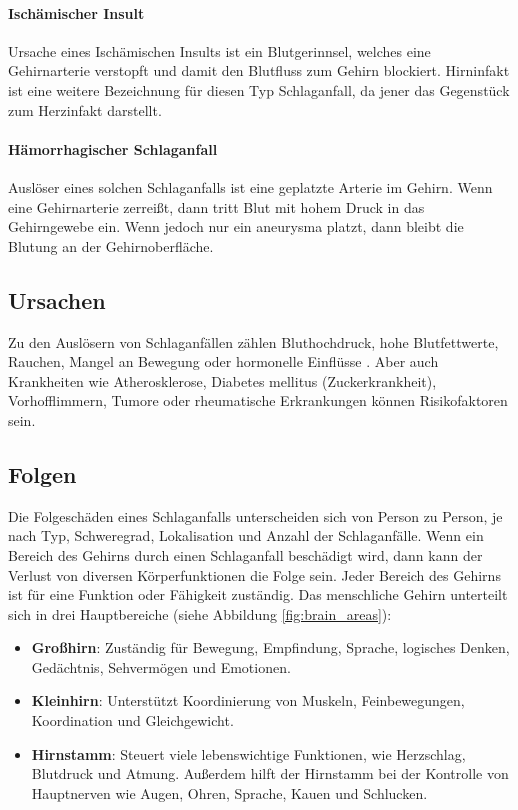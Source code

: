 \paragraph{Ischämischer Insult} \label{paragrah:isch_insult} 
Ursache eines Ischämischen Insults ist ein Blutgerinnsel, welches eine Gehirnarterie verstopft und damit den Blutfluss zum Gehirn blockiert. Hirninfakt ist eine weitere Bezeichnung für diesen Typ Schlaganfall, da jener das Gegenstück zum Herzinfakt darstellt. \cite{haring:2014:insult} 

\paragraph{Hämorrhagischer Schlaganfall}\label{paragrah:isch_haemor} 
Auslöser eines solchen Schlaganfalls ist eine geplatzte Arterie im Gehirn. Wenn eine Gehirnarterie zerreißt, dann tritt Blut mit hohem Druck in das Gehirngewebe ein. Wenn jedoch nur ein \Gls{aneurysma} platzt, dann bleibt die Blutung an der Gehirnoberfläche. \cite{haring:2014:insult} 

\subsection{Ursachen}
Zu den Auslösern von Schlaganfällen zählen Bluthochdruck, hohe Blutfettwerte, Rauchen, Mangel an Bewegung oder hormonelle Einflüsse \cite{haring:2014:insult}\cite{world:2005:avoiding}. Aber auch Krankheiten wie Atherosklerose, Diabetes mellitus (Zuckerkrankheit), Vorhofflimmern, Tumore oder rheumatische Erkrankungen können Risikofaktoren sein. \cite{haring:2014:insult} 

\subsection{Folgen}
Die Folgeschäden eines Schlaganfalls unterscheiden sich von Person zu Person, je nach Typ, Schweregrad, Lokalisation und Anzahl der Schlaganfälle. Wenn ein Bereich des Gehirns durch einen Schlaganfall beschädigt wird, dann kann der Verlust von diversen Körperfunktionen die Folge sein. Jeder Bereich des Gehirns ist für eine Funktion oder Fähigkeit zuständig. Das menschliche Gehirn unterteilt sich in drei Hauptbereiche (siehe Abbildung \ref{fig:brain_areas}): \cite{hopkins:2019:stroke_effects}

\begin{itemize}
    \item \textbf{Großhirn}: Zuständig für Bewegung, Empfindung, Sprache, logisches Denken, Gedächtnis, Sehvermögen und Emotionen.
    \item \textbf{Kleinhirn}: Unterstützt Koordinierung von Muskeln, Feinbewegungen, Koordination und Gleichgewicht.
    \item \textbf{Hirnstamm}: Steuert viele lebenswichtige Funktionen, wie Herzschlag, Blutdruck und Atmung. Außerdem hilft der Hirnstamm bei der Kontrolle von Hauptnerven wie Augen, Ohren, Sprache, Kauen und Schlucken.
\end{itemize}

